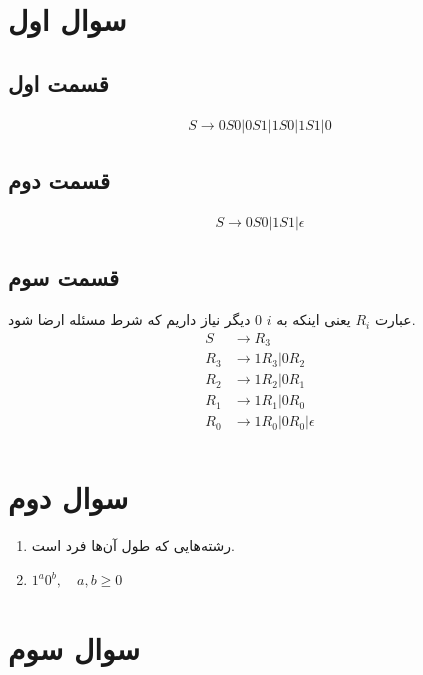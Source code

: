 \documentclass[]{article}
\begin{document}
\printheader

\section*{سوال اول}
\subsection*{قسمت اول}
\begin{gather*}
    S \rightarrow 0S0 | 0S1 | 1S0 | 1S1 | 0
\end{gather*}
\subsection*{قسمت دوم}
\begin{gather*}
    S \rightarrow 0S0 | 1S1 | \epsilon
\end{gather*}
\subsection*{قسمت سوم}
عبارت
$R_i$
یعنی اینکه به
$i$
0 دیگر نیاز داریم
که شرط مسئله ارضا شود.
\begin{align*}
    S &\rightarrow R_3\\
    R_3 &\rightarrow 1R_3 | 0R_2\\
    R_2 &\rightarrow 1R_2 | 0R_1\\
    R_1 &\rightarrow 1R_1 | 0R_0\\
    R_0 &\rightarrow 1R_0 | 0R_0 | \epsilon\\
\end{align*}
\section*{سوال دوم}
\begin{enumerate}
    \item رشته‌هایی که طول آن‌ها فرد است.
    \item $1^a 0^b, \quad a, b \ge 0$
\end{enumerate}
\section*{سوال سوم}
\end{document}
